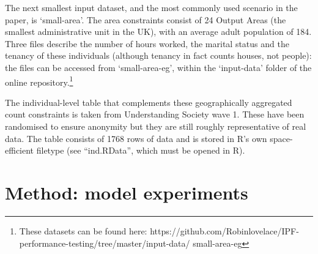 \documentclass[a4paper,10pt]{article}
\begin{document}
The next smallest input dataset, and the most commonly used scenario in the paper, 
is `small-area'. The area constraints consist of 24 Output Areas (the smallest 
administrative unit in the UK), with an average adult population of 184.
Three files describe the number of hours worked, the marital status and the
tenancy of these 
individuals (although tenancy in fact counts houses, not people): the files can
be accessed from `small-area-eg', within the `input-data' folder of the online
repository.\footnote{These datasets can be found here:
https://github.com/Robinlovelace/IPF-performance-testing/tree/master/input-data/
small-area-eg}
% 

The individual-level table that complements these geographically aggregated count constraints 
is taken from Understanding Society wave 1. These have been randomised to ensure anonymity
but they are still roughly representative of real data. The table consists of 1768 rows of 
data and is stored in R’s own space-efficient filetype (see ``ind.RData'', which must be opened in 
R).




\section{Method: model experiments}
\end{document}
